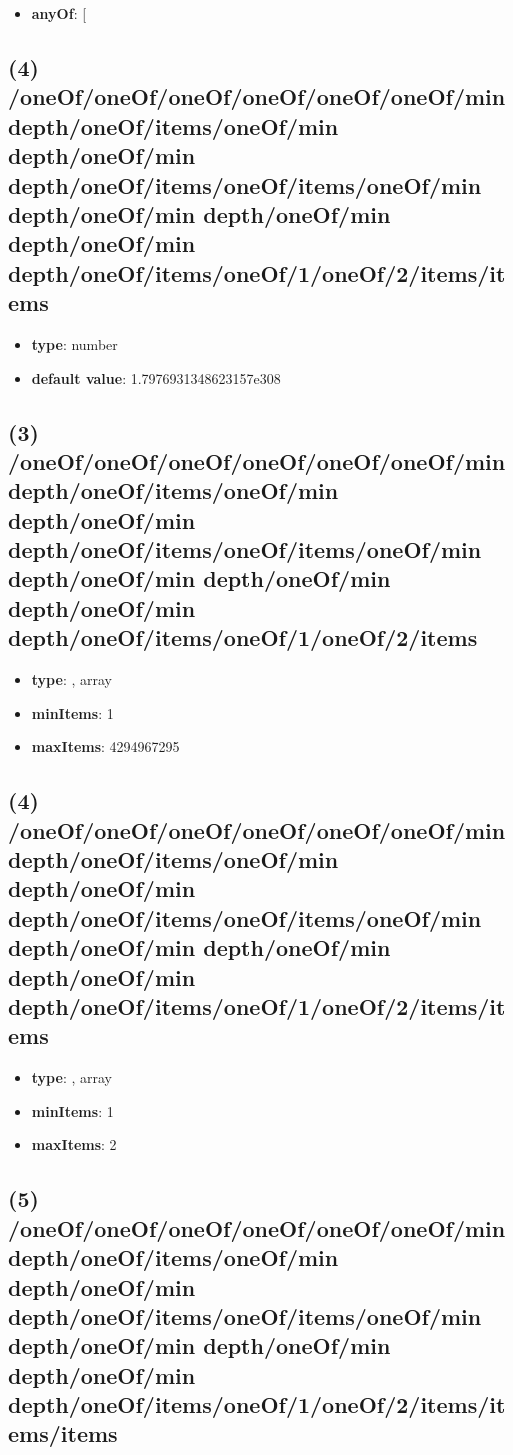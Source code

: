 \begin{itemize}[leftmargin=4em]\item {\bf anyOf}: [\end{itemize}\subsection{(4) /oneOf/oneOf/oneOf/oneOf/oneOf/oneOf/min depth/oneOf/items/oneOf/min depth/oneOf/min depth/oneOf/items/oneOf/items/oneOf/min depth/oneOf/min depth/oneOf/min depth/oneOf/min depth/oneOf/items/oneOf/1/oneOf/2/items/items}
\begin{itemize}[leftmargin=4em]\item {\bf type}: number\item {\bf default value}: 1.7976931348623157e308
\end{itemize}\subsection{(3) /oneOf/oneOf/oneOf/oneOf/oneOf/oneOf/min depth/oneOf/items/oneOf/min depth/oneOf/min depth/oneOf/items/oneOf/items/oneOf/min depth/oneOf/min depth/oneOf/min depth/oneOf/min depth/oneOf/items/oneOf/1/oneOf/2/items}
\begin{itemize}[leftmargin=3em]\item {\bf type}: , array\item {\bf minItems}: 1
\item {\bf maxItems}: 4294967295
\end{itemize}\subsection{(4) /oneOf/oneOf/oneOf/oneOf/oneOf/oneOf/min depth/oneOf/items/oneOf/min depth/oneOf/min depth/oneOf/items/oneOf/items/oneOf/min depth/oneOf/min depth/oneOf/min depth/oneOf/min depth/oneOf/items/oneOf/1/oneOf/2/items/items}
\begin{itemize}[leftmargin=4em]\item {\bf type}: , array\item {\bf minItems}: 1
\item {\bf maxItems}: 2
\end{itemize}\subsection{(5) /oneOf/oneOf/oneOf/oneOf/oneOf/oneOf/min depth/oneOf/items/oneOf/min depth/oneOf/min depth/oneOf/items/oneOf/items/oneOf/min depth/oneOf/min depth/oneOf/min depth/oneOf/min depth/oneOf/items/oneOf/1/oneOf/2/items/items/items}
